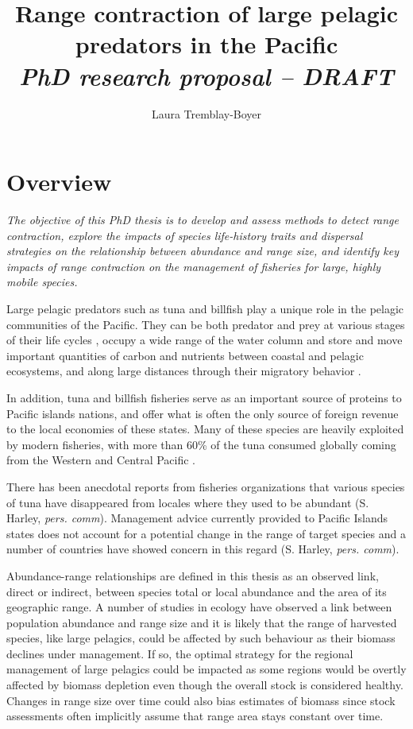 \documentclass{article}
\title{Range contraction of large pelagic predators in the Pacific \\
  \emph{\large PhD research proposal -- DRAFT}}
\author{Laura Tremblay-Boyer}
\begin{document}
\maketitle

\section*{Overview}

\emph{The objective of this PhD thesis is to develop and assess methods to detect
range contraction, explore the impacts of species life-history traits
and dispersal strategies on the relationship between abundance and
range size, and identify key impacts of range contraction on the
 management of fisheries for large, highly mobile species.}

Large pelagic predators such as tuna and billfish play a unique role
in the pelagic communities of the Pacific. They can be both predator
and prey at various stages of their life cycles \citep{Young2010_a,
  Cox2002_a, Hinke2004_a}, occupy a wide range of the water column
\citep{Schaefer2009_a} and store and move important quantities of
carbon and nutrients between coastal and pelagic ecosystems, and along
large distances through their migratory behavior
\citep{Allain2012_a}.

In addition, tuna and billfish fisheries serve as an important source
of proteins to Pacific islands nations, and offer what is often the
only source of foreign revenue to the local economies of these
states. Many of these species are heavily exploited by modern
fisheries, with more than 60\% of the tuna consumed globally
coming from the Western and Central Pacific \citep{Williams2012_a}.

There has been anecdotal reports from fisheries organizations that
various species of tuna have disappeared from locales where they used
to be abundant (S. Harley, \emph{pers. comm}). Management advice
currently provided to Pacific Islands states does not account for a
potential change in the range of target species and a number of
countries have showed concern in this regard (S. Harley,
\emph{pers. comm}).

Abundance-range relationships are defined in this thesis as an
observed link, direct or indirect, between species total or local
abundance and the area of its geographic range. A number of
studies in ecology have observed a link between population abundance
and range size \citep{Gaston2000_a, MacCall1990_a, Lawton1993_a} and
it is likely that the range of harvested species, like large
pelagics, could be affected by such behaviour as their biomass
declines under management. If so, the
optimal strategy for the regional management of large pelagics could
be impacted as some regions would be overtly affected by biomass depletion
even though the overall stock is considered healthy. Changes in range
size over time could also bias estimates of biomass since stock
assessments often implicitly assume that range area stays constant over
time.
\end{document}
